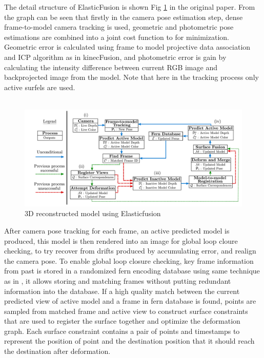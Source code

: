 \documentclass[12pt,twoside]{article}
\begin{document}
The detail structure of ElasticFusion is shown Fig \ref{fig:elas1} in the original paper. From the graph can be seen that firstly in the camera pose estimation step, dense frame-to-model camera tracking is used, geometric and photometric pose estimations are combined into a joint cost function to for minimization. Geometric error is calculated using frame to model projective data association and ICP algorithm as in kinecFusion\citep{newcombe2011kinectfusion}, and photometric error is gain by calculating the intensity difference between current RGB image and backprojected image from the model. Note that here in the tracking process only active surfels are used.\\
\\
\begin{figure}[h]
    \centering
    \includegraphics[width=1.0\textwidth]{figures/elas1}
    \caption{3D reconstructed model using Elasticfusion}
    \label{fig:elas1}
\end{figure}
After camera pose tracking for each frame, an active predicted model is produced, this model is then rendered into an image for global loop cloure checking, to try recover from drifts produced by accumulating error, and realign the camera pose. To enable global loop closure checking, key frame information from past is stored in a randomized fern encoding database using same technique as in \cite{glocker2015real}, it allows storing and matching frames without putting redundant information into the database. If a high quality match between the current predicted view of active model and a frame in fern database is found, points are sampled from matched frame and active view to construct surface constraints that are used to register the surface together and optimize the deformation graph. Each surface constraint contains a pair of points and timestamps to represent the position of point and the destination position that it should reach the destination after deformation.\\
\end{document}
